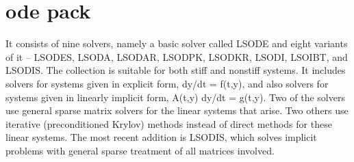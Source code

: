 \section{\ac{ode} pack}
It consists of nine solvers, namely a basic solver called LSODE and eight variants of it -- LSODES, LSODA, LSODAR, LSODPK, LSODKR, LSODI, LSOIBT, and LSODIS. The collection is suitable for both stiff and nonstiff systems.  It includes solvers for systems given in explicit form, dy/dt = f(t,y), and also solvers for systems given in linearly implicit form,  A(t,y) dy/dt = g(t,y).  Two of the solvers use general sparse matrix solvers for the linear systems that arise.  Two others use iterative (preconditioned Krylov) methods instead of direct methods for these linear systems.  The most recent addition is LSODIS, which solves implicit problems with general sparse treatment of all matrices involved.
